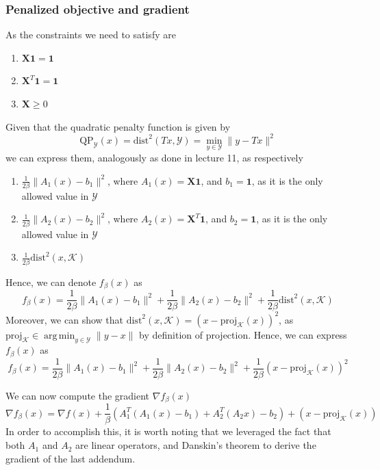 \documentclass[12pt]{article}
\DeclareMathOperator*{\argmin}{arg\,min}
\newcommand{\boldX}{\mathbf{X}}
\newcommand{\boldOne}{\mathbf{1}}
\newcommand{\dist}{\text{dist}}
\newcommand{\QP}{\text{QP}}
\newcommand*{\proj}{\text{proj}}
\begin{document}
\subsubsection{Penalized objective and gradient}
As the constraints we need to satisfy are
\begin{enumerate}
    \item $\boldX \boldOne = \boldOne$
    \item $\boldX^T \boldOne = \boldOne$
    \item $\boldX \geq 0$
\end{enumerate}
Given that the quadratic penalty function is given by
\begin{equation}
    \QP_{\mathcal{Y}}(x) = \dist^2(Tx, \mathcal{Y}) = \min_{y \in \mathcal{Y}} \lVert y - Tx \rVert^2
\end{equation}
we can express them, analogously as done in lecture 11, as respectively
\begin{enumerate}
    \item $\frac{1}{2\beta} \lVert A_1(x) - b_1 \rVert^{2}$, where $A_1(x) = \boldX \boldOne$, and $b_1 = \boldOne$, as it is the only allowed value in $\mathcal{Y}$
    \item $\frac{1}{2\beta} \lVert A_2(x) - b_2 \rVert^{2}$, where $A_2(x) = \boldX^T \boldOne$, and $b_2 = \boldOne$, as it is the only allowed value in $\mathcal{Y}$
    \item $\frac{1}{2\beta} \dist^2(x, \mathcal{K})$
\end{enumerate}
Hence, we can denote $f_{\beta}(x)$ as
\begin{equation}
    f_{\beta}(x) = \frac{1}{2\beta} \lVert A_1(x) - b_1 \rVert^{2} + \frac{1}{2\beta} \lVert A_2(x) - b_2 \rVert^{2} + \frac{1}{2\beta} \dist^2(x, \mathcal{K})
\end{equation}
Moreover, we can show that $\dist^2(x, \mathcal{K}) = (x - \proj_{\mathcal{K}}(x))^2$, as $\proj_{\mathcal{K}} \in \argmin_{y \in \mathcal{Y}} \lVert y - x \rVert $ by definition of projection. Hence, we can express $f_{\beta}(x)$ as
\begin{equation}
    f_{\beta}(x) = \frac{1}{2\beta} \lVert A_1(x) - b_1 \rVert^{2} + \frac{1}{2\beta} \lVert A_2(x) - b_2 \rVert^{2} + \frac{1}{2\beta} (x - \proj_{\mathcal{K}}(x))^2
\end{equation}

We can now compute the gradient $\nabla f_{\beta}(x)$
\begin{equation}
    \nabla f_{\beta}(x) = \nabla f(x) + \frac{1}{\beta} (A_1^T(A_1(x) - b_1) + A_2^T(A_2x) - b_2) + (x - \proj_{\mathcal{K}}(x))
\end{equation}
In order to accomplish this, it is worth noting that we leveraged the fact that both $A_1$ and $A_2$ are linear operators, and Danskin's theorem to derive the gradient of the last addendum.
\end{document}
